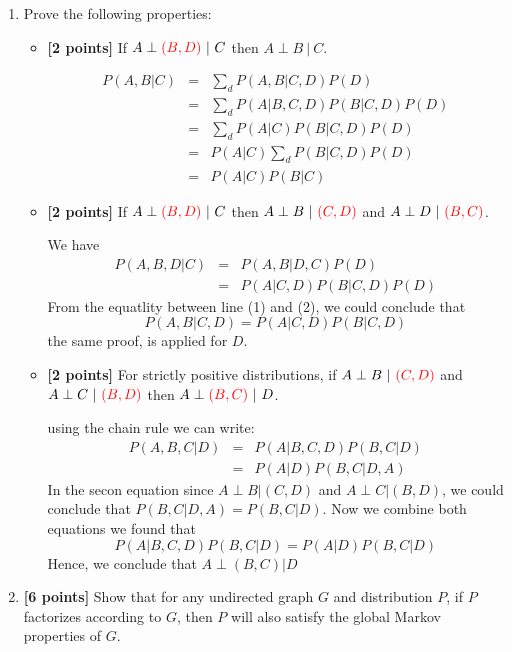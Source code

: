 \documentclass[12pt]{article}
\begin{document}
\begin{enumerate}
    \item Prove the following properties:
    \begin{itemize}
        \item \textbf{[2 points]} If $A \perp {\color{red} (B,D) } \ | \ C$ then $A \perp B \ | \ C$.
        \begin{solution}
          \small
         \begin{eqnarray*}
           P(A, B|C) &=& \sum_d P(A, B|C,D) P(D) \\
                     &=& \sum_d P(A|B,C,D) P(B|C,D) P(D)\\
                     &=& \sum_d P(A|C) P(B|C,D)P(D)\\
                     &=& P(A|C) \sum_d P(B|C,D)P(D)\\
                     &=& P(A|C) P(B|C)
         \end{eqnarray*} 
        \end{solution}
        \item \textbf{[2 points]} If $A \perp {\color{red} (B,D) } \ | \ C$ then $A \perp B \ | \ {\color{red} (C,D) }$ and $A \perp D \ | \ {\color{red} (B,C) }$.
      \begin{solution}
        We have
        \begin{eqnarray}
          P(A,B,D|C) &=&  P(A,B|D,C)P(D)\\
                     &=& P(A|C,D) P(B|C,D) P(D)
        \end{eqnarray}
        From the equatlity  between line (1) and (2), we could conclude
        that 
      \[
      P(A,B|C,D) = P(A|C,D) P(B|C,D)
      \]
      the same proof, is applied for $D$.
      \end{solution}
        \item \textbf{[2 points]} For strictly positive distributions, if $A \perp B \ | \ {\color{red} (C,D) }$ and $A \perp C \ | \ {\color{red} (B,D) }$ then $A \perp {\color{red} (B,C) } \ | \ D$.
          \begin{solution}
          using the chain rule we can write:
            \begin{eqnarray*}
              P(A,B,C|D) &=& P(A|B,C,D) P(B,C|D)\\
                         &=& P(A|D) P (B,C|D,A)
            \end{eqnarray*}
            In the secon equation since $A \perp B | (C,D)$ and $A \perp C|
            (B,D)$, we could conclude that $P(B,C|D,A) = P(B,C|D)$. Now we
            combine both equations we found that 
            \[
              P(A|B,C,D)P(B,C|D) = P(A|D)P(B,C|D)
            \]
            Hence, we conclude that $A\perp (B,C) | D$
          \end{solution}
    \end{itemize}
    \item \textbf{[6 points]} Show that for any undirected graph $G$ and distribution $P$, if $P$ factorizes according to $G$, then $P$ will also satisfy the global Markov properties of $G$.


\end{enumerate}
\end{document}
